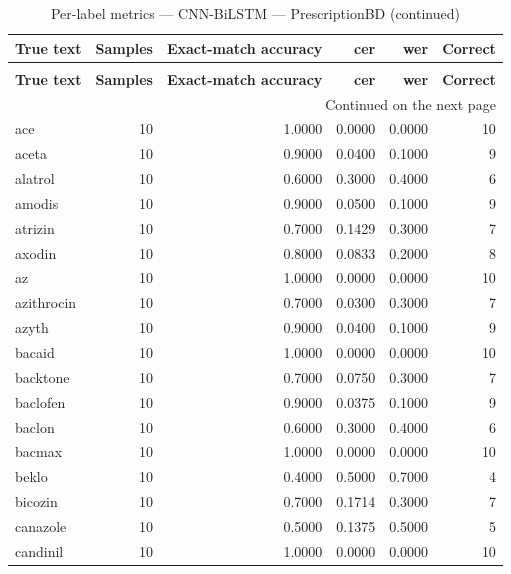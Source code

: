 \begingroup
\setlength{\tabcolsep}{2.5pt}
\renewcommand{\arraystretch}{1.05}
\sloppy
\scriptsize
\begin{longtable}{p{3.0cm}rrrrr}
\caption{Per-label metrics — CNN-BiLSTM — PrescriptionBD}\label{tab:e2-01_e2cnn_bilstm_evaluation-per-label}\\
\toprule
\textbf{True text} & \textbf{Samples} & \textbf{Exact-match accuracy} & \textbf{cer} & \textbf{wer} & \textbf{Correct} \\
\midrule
\endfirsthead
\caption*{Per-label metrics — CNN-BiLSTM — PrescriptionBD (continued)}\\
\toprule
\textbf{True text} & \textbf{Samples} & \textbf{Exact-match accuracy} & \textbf{cer} & \textbf{wer} & \textbf{Correct} \\
\midrule
\endhead
\midrule
\multicolumn{6}{r}{Continued on the next page}\\
\endfoot
\bottomrule
\endlastfoot
ace & 10 & 1.0000 & 0.0000 & 0.0000 & 10 \\
aceta & 10 & 0.9000 & 0.0400 & 0.1000 & 9 \\
alatrol & 10 & 0.6000 & 0.3000 & 0.4000 & 6 \\
amodis & 10 & 0.9000 & 0.0500 & 0.1000 & 9 \\
atrizin & 10 & 0.7000 & 0.1429 & 0.3000 & 7 \\
axodin & 10 & 0.8000 & 0.0833 & 0.2000 & 8 \\
az & 10 & 1.0000 & 0.0000 & 0.0000 & 10 \\
azithrocin & 10 & 0.7000 & 0.0300 & 0.3000 & 7 \\
azyth & 10 & 0.9000 & 0.0400 & 0.1000 & 9 \\
bacaid & 10 & 1.0000 & 0.0000 & 0.0000 & 10 \\
backtone & 10 & 0.7000 & 0.0750 & 0.3000 & 7 \\
baclofen & 10 & 0.9000 & 0.0375 & 0.1000 & 9 \\
baclon & 10 & 0.6000 & 0.3000 & 0.4000 & 6 \\
bacmax & 10 & 1.0000 & 0.0000 & 0.0000 & 10 \\
beklo & 10 & 0.4000 & 0.5000 & 0.7000 & 4 \\
bicozin & 10 & 0.7000 & 0.1714 & 0.3000 & 7 \\
canazole & 10 & 0.5000 & 0.1375 & 0.5000 & 5 \\
candinil & 10 & 1.0000 & 0.0000 & 0.0000 & 10 \\

\end{longtable}
